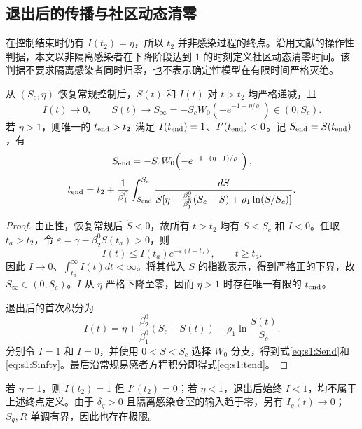 \documentclass[lang=cn,a4paper,newtx]{elegantpaper}
\numberwithin{equation}{section}
\theoremstyle{plain}
\begin{document}
\subsection{退出后的传播与社区动态清零}
在控制结束时仍有 $I(t_2)=\eta$，所以 $t_2$ 并非感染过程的终点。沿用文献\cite{Zhou2024SPCI}的操作性判据，本文以非隔离感染者在下降阶段达到 $1$ 的时刻定义社区动态清零时间。该判据不要求隔离感染者同时归零，也不表示确定性模型在有限时间严格灭绝。
\begin{theorem}
\label{thm:s1:tend}\label{thm:s1:post}
从 $(S_c,\eta)$ 恢复常规控制后，$S(t)$ 和 $I(t)$ 对 $t>t_2$ 均严格递减，且
\begin{equation}
I(t)\to0,\qquad
S(t)\to S_\infty=-S_cW_0\!\left(-e^{-1-\eta/\rho_1}\right)\in(0,S_c).
\label{eq:s1:Sinfty}
\end{equation}
若 $\eta>1$，则唯一的 $t_{\rm end}>t_2$ 满足 $I(t_{\rm end})=1$、$I'(t_{\rm end})<0$。记 $S_{\rm end}=S(t_{\rm end})$，有
\begin{equation}
S_{\rm end}=-S_cW_0\!\left(-e^{-1-(\eta-1)/\rho_1}\right),
\label{eq:s1:Send}
\end{equation}
\begin{equation}
t_{\rm end}=t_2+\frac{1}{\beta_1^0}\int_{S_{\rm end}}^{S_c}
\frac{dS}{S[\eta+\frac{\beta_2^0}{\beta_1^0}(S_c-S)+\rho_1\ln(S/S_c)]}.
\label{eq:s1:tend}
\end{equation}
\end{theorem}
\begin{proof}
由正性，恢复常规后 $\dot S<0$，故所有 $t>t_2$ 均有 $S<S_c$ 和 $\dot I<0$。任取 $t_a>t_2$，令 $\varepsilon=\gamma-\beta_2^0S(t_a)>0$，则
\[
I(t)\le I(t_a)e^{-\varepsilon(t-t_a)},\qquad t\ge t_a.
\]
因此 $I\to0$、$\int_{t_a}^{\infty}I(t)dt<\infty$。将其代入 $S$ 的指数表示，得到严格正的下界，故 $S_\infty\in(0,S_c)$。$I$ 从 $\eta$ 严格下降至零，因而 $\eta>1$ 时存在唯一有限的 $t_{\rm end}$。

退出后的首次积分为
\begin{equation}
I(t)=\eta+\frac{\beta_2^0}{\beta_1^0}(S_c-S(t))+\rho_1\ln\frac{S(t)}{S_c}.
\label{eq:s1:post-orbit}
\end{equation}
分别令 $I=1$ 和 $I=0$，并使用 $0<S<S_c$ 选择 $W_0$ 分支，得到式\eqref{eq:s1:Send}和\eqref{eq:s1:Sinfty}。最后沿常规易感者方程积分即得式\eqref{eq:s1:tend}。
\end{proof}
若 $\eta=1$，则 $I(t_2)=1$ 但 $I'(t_2)=0$；若 $\eta<1$，退出后始终 $I<1$，均不属于上述终点定义。由于 $\delta_q>0$ 且隔离感染仓室的输入趋于零，另有 $I_q(t)\to0$；$S_q,R$ 单调有界，因此也存在极限。
\end{document}
